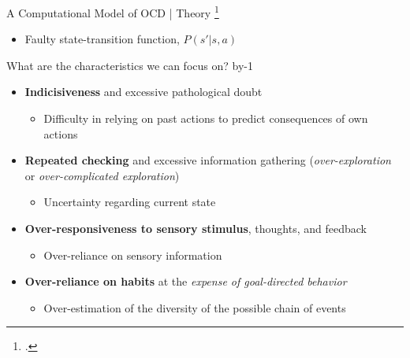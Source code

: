 \documentclass[t,aspectratio=169,xcolor=dvipsnames]{beamer}
\makeatletter
\newcommand\blfootcitetext[1]{%
  \begingroup
  \renewcommand\thefootnote{}\footcitetext{#1}%
  \addtocounter{footnote}{-1}%
  \endgroup
}
\newcommand{\trickbeamer}{\advance\beamer@slideinframe by-1}
\makeatother
\begin{document}
{%
}

\begin{frame}{A Computational Model of OCD | Theory}
    \blfootcitetext{fradkin2018rigidly}
    \begin{itemize}
        \item<+-> Faulty state-transition function, $P(s'|s, a)$
    \end{itemize}
\end{frame}

\begin{frame}[c]{What are the characteristics we can focus on?}
    \trickbeamer
    \begin{itemize}
        \item \textbf{Indicisiveness} and excessive pathological doubt
        \begin{itemize}
            \item<+-> Difficulty in relying on past actions to predict consequences of own actions
        \end{itemize}
        
        \item \textbf{Repeated checking} and excessive information gathering (\textit{over-exploration} or \textit{over-complicated exploration})
        \begin{itemize}
            \item<+-> Uncertainty regarding current state
        \end{itemize}
        
        \item \textbf{Over-responsiveness to sensory stimulus}, thoughts, and feedback
        \begin{itemize}
            \item<+-> Over-reliance on sensory information
        \end{itemize}

        \item \textbf{Over-reliance on habits} at the \textit{expense of goal-directed behavior}
        \begin{itemize}
            \item<+-> Over-estimation of the diversity of the possible chain of events
        \end{itemize}
    \end{itemize}
\end{frame}
\end{document}
